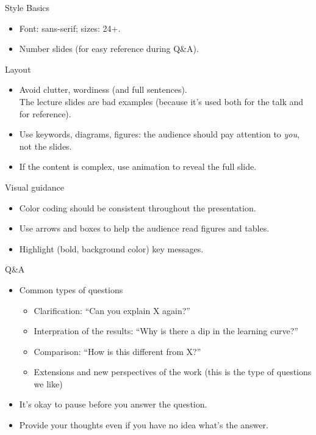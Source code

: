 \documentclass[usenames,dvipsnames,11pt,aspectratio=169]{beamer}
\begin{document}
\begin{frame}
    {Style}
    Basics\\
    \begin{itemize}
        \item Font: sans-serif; sizes: 24+.
        \item Number slides (for easy reference during Q\&A).
    \end{itemize}

    Layout\\
    \begin{itemize}
        \item Avoid clutter, wordiness (and full sentences).\\
              The lecture slides are bad examples (because it's used both for the talk and for reference).
        \item Use keywords, diagrams, figures: the audience should pay attention to \textit{you}, not the slides.
        \item If the content is complex, use animation to reveal the full slide.
    \end{itemize}

    Visual guidance\\ 
    \begin{itemize}
        \item Color coding should be consistent throughout the presentation.
        \item Use arrows and boxes to help the audience read figures and tables.
        \item Highlight (bold, background color) key messages.
    \end{itemize}
\end{frame}

\begin{frame}
    {Q\&A}
    \begin{itemize}
        \item Common types of questions
            \begin{itemize}
                \item Clarification: ``Can you explain X again?''
                \item Interpration of the results: ``Why is there a dip in the learning curve?''
                \item Comparison: ``How is this different from X?''
                \item Extensions and new perspectives of the work (this is the type of questions we like)
            \end{itemize}
        \item It's okay to pause before you answer the question.
        \item Provide your thoughts even if you have no idea what's the answer.
    \end{itemize}
\end{frame}
\end{document}
